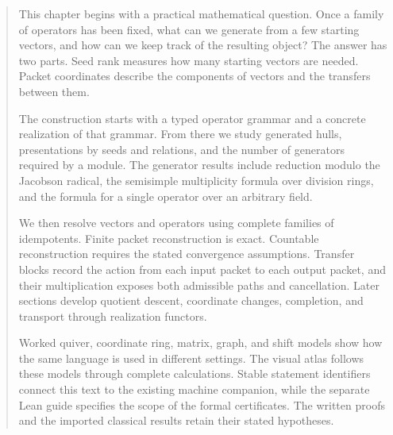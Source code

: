 \documentclass[11pt]{article}
\theoremstyle{definition}
\theoremstyle{remark}
\theoremstyle{definition}\newtheorem{example}[theorem]{Example}
\begin{document}
\KomorebiCover
\begin{abstract}
This chapter begins with a practical mathematical question. Once a family of operators has been fixed, what can we generate from a few starting vectors, and how can we keep track of the resulting object? The answer has two parts. Seed rank measures how many starting vectors are needed. Packet coordinates describe the components of vectors and the transfers between them.

The construction starts with a typed operator grammar and a concrete realization of that grammar. From there we study generated hulls, presentations by seeds and relations, and the number of generators required by a module. The generator results include reduction modulo the Jacobson radical, the semisimple multiplicity formula over division rings, and the formula for a single operator over an arbitrary field.

We then resolve vectors and operators using complete families of idempotents. Finite packet reconstruction is exact. Countable reconstruction requires the stated convergence assumptions. Transfer blocks record the action from each input packet to each output packet, and their multiplication exposes both admissible paths and cancellation. Later sections develop quotient descent, coordinate changes, completion, and transport through realization functors.

Worked quiver, coordinate ring, matrix, graph, and shift models show how the same language is used in different settings. The visual atlas follows these models through complete calculations. Stable statement identifiers connect this text to the existing machine companion, while the separate Lean guide specifies the scope of the formal certificates. The written proofs and the imported classical results retain their stated hypotheses.
\end{abstract}

\clearpage
\begingroup\small{}\tableofcontents\endgroup
\clearpage


\clearpage{}





\end{document}
